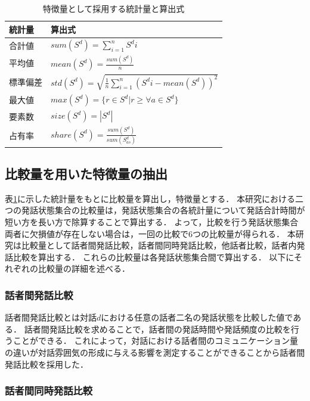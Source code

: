 \begingroup
\renewcommand{\arraystretch}{1.5}
\begin{table}[t]
    \caption{特徴量として採用する統計量と算出式}
    \centering
    \begin{tabular}{ll}
        \hline
        統計量 & 算出式 \\
        \hline\hline
        合計値 & $sum(S^d) = \sum_{i=1}^n S^di$ \\
        \hline
        平均値 & $mean(S^d) = \frac{sum(S^d)}{n}$ \\
        \hline
        標準偏差 & $std(S^d) = \sqrt{\frac{1}{n}\sum_{i=1}^n (S^di - mean(S^d))^2}$ \\
        \hline
        最大値 & $max(S^d) = \{r\in{S^d} | r \geq \forall{a}\in{S^d} \}$ \\
        \hline
        要素数  & $size(S^d) = |S^d|$ \\
        \hline
        占有率  & $share(S^d) = \frac{sum(S^d)}{sum(S^d_{as})}$ \\
        \hline
    \end{tabular}
    \label{tab:statistics_and_formulas}
\end{table}
\endgroup

\subsection{比較量を用いた特徴量の抽出}

表\ref{tab:statistics_and_formulas}に示した統計量をもとに比較量を算出し，特徴量とする．
本研究における二つの発話状態集合の比較量は，発話状態集合の各統計量について発話合計時間が短い方を長い方で除算することで算出する．
よって，比較を行う発話状態集合両者に欠損値が存在しない場合は，一回の比較で6つの比較量が得られる．
本研究は比較量として話者間発話比較，話者間同時発話比較，他話者比較，話者内発話比較を算出する．
これらの比較量は各発話状態集合間で算出する．
以下にそれぞれの比較量の詳細を述べる．

\subsubsection{話者間発話比較}

話者間発話比較とは対話$d$における任意の話者二名の発話状態を比較した値である．
話者間発話比較を求めることで，話者間の発話時間や発話頻度の比較を行うことができる．
これによって，対話における話者間のコミュニケーション量の違いが対話雰囲気の形成に与える影響を測定することができることから話者間発話比較を採用した．

\subsubsection{話者間同時発話比較}

